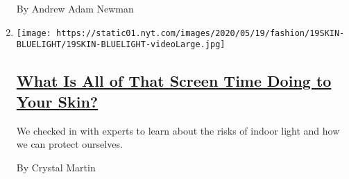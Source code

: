 \begin{enumerate}
  By Andrew Adam Newman
\item
  \texttt{[image: https://static01.nyt.com/images/2020/05/19/fashion/19SKIN-BLUELIGHT/19SKIN-BLUELIGHT-videoLarge.jpg]}

  \hypertarget{what-is-all-of-that-screen-time-doing-to-your-skin}{%
  \subsection{\texorpdfstring{\href{/2020/05/20/style/skin-damage-blue-light-what-is-all-of-that-screen-time-doing-to-your-skin.html}{What
  Is All of That Screen Time Doing to Your
  Skin?}}{What Is All of That Screen Time Doing to Your Skin?}}\label{what-is-all-of-that-screen-time-doing-to-your-skin}}

  We checked in with experts to learn about the risks of indoor light
  and how we can protect ourselves.

  By Crystal Martin
\end{enumerate}

